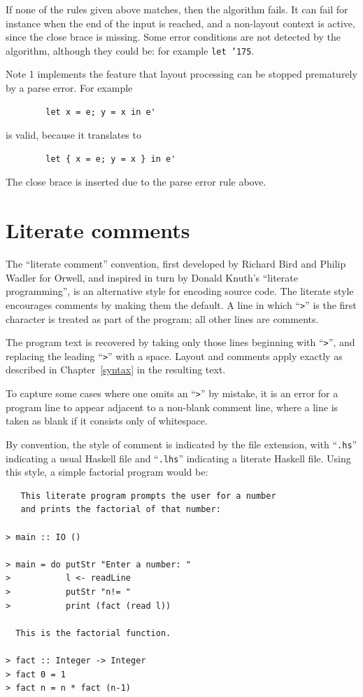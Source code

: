 If none of the rules given above matches, then the algorithm fails. It
can fail for instance when the end of the input is reached, and a
non-layout context is active, since the close brace is missing. Some
error conditions are not detected by the algorithm, although they
could be: for example \mbox{\tt let\ {\char'175}}.

Note 1 implements the feature that layout processing can be stopped
prematurely by a parse error.  For example
\bprog
{\small\begin{verbatim}
        let x = e; y = x in e'
\end{verbatim}}
\eprog
is valid, because it translates to 
\bprog
{\small\begin{verbatim}
        let { x = e; y = x } in e'
\end{verbatim}}
\eprog
The close brace is inserted due to the parse error rule above.

\startnewsection
\section{Literate comments}
\label{literate}

The ``literate comment''
convention, first developed by Richard Bird and Philip Wadler for
Orwell, and inspired in turn by Donald Knuth's ``literate
programming'', is an alternative style for encoding \Haskell{} source
code. 
The literate style encourages comments by making them the default.  A
line in which ``\mbox{\tt >}'' is the first character is treated as part of the
program; all other lines are comments.

The program text is recovered
by taking only those lines beginning with ``\mbox{\tt >}'', 
and replacing the leading ``\mbox{\tt >}'' with a space.
Layout and comments apply
exactly as described in Chapter~\ref{syntax} in the resulting text.

To capture some cases where one omits an ``\mbox{\tt >}'' by mistake, it is an
error for a program line to appear adjacent to a non-blank comment line,
where a line is taken as blank if it consists only of whitespace.

By convention, the style of comment is indicated by the file
extension, with ``\mbox{\tt .hs}'' indicating a usual Haskell file and
``\mbox{\tt .lhs}'' indicating a literate Haskell file.  Using this style, a
simple factorial program would be:
\bprog
{\small\begin{verbatim}
   This literate program prompts the user for a number
   and prints the factorial of that number:

> main :: IO ()

> main = do putStr "Enter a number: "
>           l <- readLine
>           putStr "n!= "
>           print (fact (read l))
          
  This is the factorial function.

> fact :: Integer -> Integer
> fact 0 = 1
> fact n = n * fact (n-1)
\end{verbatim}}
\eprog


